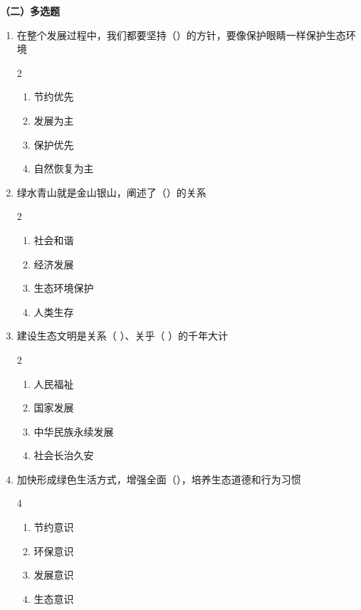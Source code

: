 \documentclass[a4paper,11pt]{ctexart}
\begin{document}
\textbf{（二）多选题}
\begin{enumerate}
    \item 在整个发展过程中，我们都要坚持（）的方针，要像保护眼睛一样保护生态环境
    \begin{multicols}{2}
    \begin{enumerate}
        \item 节约优先
        \item 发展为主
        \item 保护优先
        \item 自然恢复为主
    \end{enumerate}
    \end{multicols}

    \item 绿水青山就是金山银山，阐述了（）的关系
    \begin{multicols}{2}
    \begin{enumerate}
        \item 社会和谐
        \item 经济发展
        \item 生态环境保护
        \item 人类生存
    \end{enumerate}
    \end{multicols}

    \item 建设生态文明是关系（ ）、关乎（ ）的千年大计
    \begin{multicols}{2}
    \begin{enumerate}
        \item 人民福祉
        \item 国家发展
        \item 中华民族永续发展
        \item 社会长治久安
    \end{enumerate}
    \end{multicols}

    \item 加快形成绿色生活方式，增强全面（），培养生态道德和行为习惯
    \begin{multicols}{4}
    \begin{enumerate}
        \item 节约意识
        \item 环保意识
        \item 发展意识
        \item 生态意识
    \end{enumerate}
    \end{multicols}


\end{enumerate}
\end{document}
